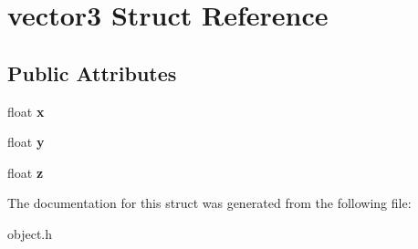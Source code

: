\hypertarget{structvector3}{}\section{vector3 Struct Reference}
\label{structvector3}
\subsection*{Public Attributes}
\begin{DoxyCompactItemize}
\item 
\mbox{\label{structvector3_ac8ec8f1bd94c5063f00e026155aaee28}} 
float {\bfseries x}
\item 
\mbox{\label{structvector3_a5200950ba6a3e3b1f0d5f6329e84e7c6}} 
float {\bfseries y}
\item 
\mbox{\label{structvector3_a850da8a0f71ec04b32739c4410a60746}} 
float {\bfseries z}
\end{DoxyCompactItemize}


The documentation for this struct was generated from the following file\+:\begin{DoxyCompactItemize}
\item 
object.\+h\end{DoxyCompactItemize}
